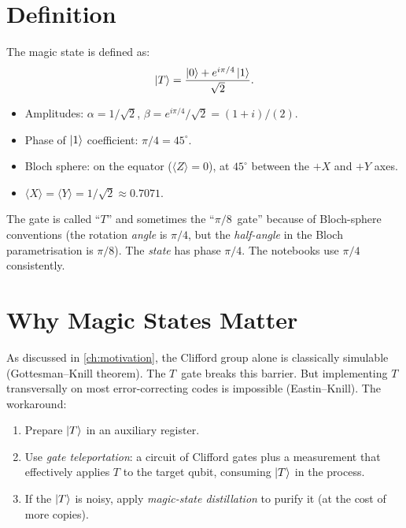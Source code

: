 \documentclass[11pt,a4paper,twoside]{report}
\theoremstyle{definition}
\newcommand{\expect}[1]{\langle #1 \rangle}
\newcommand{\ketT}{\ket{T}}
\begin{document}
\section{Definition}

The magic state is defined as:
\begin{equation}
  \ketT = \frac{\ket{0} + e^{i\pi/4}\ket{1}}{\sqrt{2}}.
  \label{eq:tstate}
\end{equation}

\begin{concept}[title={T-state Properties}]
\begin{itemize}[nosep]
  \item Amplitudes: $\alpha = 1/\sqrt{2}$,
        $\beta = e^{i\pi/4}/\sqrt{2} = (1+i)/(2)$.
  \item Phase of $\ket{1}$ coefficient: $\pi/4 = 45^\circ$.
  \item Bloch sphere: on the equator ($\expect{Z} = 0$), at $45^\circ$
        between the $+X$ and $+Y$ axes.
  \item $\expect{X} = \expect{Y} = 1/\sqrt{2} \approx 0.7071$.
\end{itemize}
\end{concept}

\begin{warning}[title={$\pi/4$ vs.\ $\pi/8$}]
The gate is called ``$T$'' and sometimes the ``$\pi/8$~gate'' because
of Bloch-sphere conventions (the rotation \emph{angle} is $\pi/4$, but
the \emph{half-angle} in the Bloch parametrisation is $\pi/8$). The
\emph{state} has phase $\pi/4$. The notebooks use $\pi/4$ consistently.
\end{warning}

\section{Why Magic States Matter}

As discussed in \cref{ch:motivation}, the Clifford group alone is
classically simulable (Gottesman--Knill theorem). The $T$~gate breaks
this barrier. But implementing $T$ transversally on most error-correcting
codes is impossible (Eastin--Knill). The workaround:

\begin{enumerate}
  \item Prepare $\ketT$ in an auxiliary register.
  \item Use \emph{gate teleportation}: a circuit of Clifford gates plus
        a measurement that effectively applies $T$ to the target qubit,
        consuming $\ketT$ in the process.
  \item If the $\ketT$ is noisy, apply \emph{magic-state distillation}
        to purify it (at the cost of more copies).
\end{enumerate}
\end{document}
